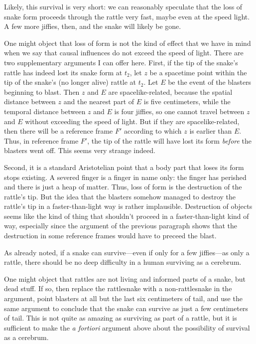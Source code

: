 Likely, this survival is very short: we can reasonably speculate that the loss of snake form proceeds through the rattle 
very fast, maybe even at the speed light. A few more jiffies, then, and the snake will likely be gone.

One might object that loss of form is not the kind of effect that we have in mind when we say that causal influences do not 
exceed the speed of light. There are two supplementary arguments I can offer here. First, if the tip of the snake's rattle 
has indeed lost its snake form at $t_2$, let $z$ be a spacetime point within the tip of the snake's (no longer alive) rattle 
at $t_2$. Let $E$ be the event of the blasters beginning to blast. Then $z$ and $E$ are spacelike-related, because the spatial 
distance between $z$ and the nearest part of $E$ is five centimeters, while the temporal distance between $z$ and $E$ is four
jiffies, so one cannot travel between $z$ and $E$ without exceeding the speed of light. But if they are spacelike-related, then
there will be a reference frame $F'$ according to which $z$ is earlier than $E$. Thus, in reference frame $F'$, the tip of the 
rattle will have lost its form \textit{before} the blasters went off. This seems very strange indeed.

Second, it is a standard Aristotelian point that a body part that loses its form stops existing. A severed finger is a 
finger in name only: the finger has perished and there is just a heap of matter. Thus, loss of form is the destruction 
of the rattle's tip. But the idea that the blasters somehow managed to destroy the rattle's tip in a faster-than-light 
way is rather implausible. Destruction of objects seems like the kind of thing that shouldn't proceed in a faster-than-light
kind of way, especially since the argument of the previous paragraph shows that the destruction in some reference frames 
would have to preceed the blast. 

As already noted, if a snake can survive---even if only for a few jiffies---as only a rattle, there should be no deep 
difficulty in a human surviving as a cerebrum. 

One might object that rattles are not living and informed parts of a snake, but dead stuff. If so, then replace the 
rattlesnake with a non-rattlesnake in the argument, point blasters at all but the last six centimeters of tail, and 
use the same argument to conclude that the snake can survive as just a few centimeters of tail. This is not quite as 
amazing as surviving as part of a rattle, but it is sufficient to make the \textit{a fortiori} argument above about the 
possibility of survival as a cerebrum.

